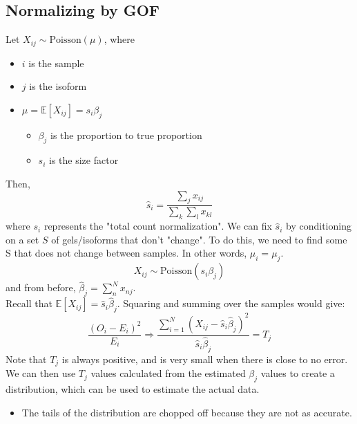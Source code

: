 \documentclass[10pt]{article}
\begin{document}
\subsection*{Normalizing by GOF}
Let $X_{ij} \sim \text{Poisson}(\mu)$, where
\begin{itemize}
    \item $i$ is the sample
    \item $j$ is the isoform
    \item $\mu = \mathbb{E}[X_{ij}] = s_i \beta_j$
    \begin{itemize}
        \item $\beta_j$ is the proportion to true proportion
        \item $s_i$ is the size factor
    \end{itemize}
\end{itemize}    
Then,
\[\hat s_i = \frac{\sum_j x_{ij}}{\sum_k \sum_l x_{kl}}\]
where $s_i$ represents the "total count normalization".  We can fix $\hat s_i$ by conditioning on a set $S$ of gels/isoforms that don't "change".  To do this, we need to find some S that does not change between samples.  In other words, $\mu_i = \mu_j$.
\[X_{ij} \sim \text{Poisson}(s_i \beta_j)\]
and from before, $\hat \beta_j = \sum_n^N x_{nj}$.\\
Recall that $\mathbb{E}[X_{ij}] = \hat s_i \hat \beta_j$.  Squaring and summing over the samples would give:
\[\frac{(O_i - E_i)^2}{E_i} \Rightarrow \frac{\sum_{i = 1}^N (X_{ij} - \hat s_i \hat \beta_j)^2}{\hat s_i \hat \beta_j} = T_j\]
Note that $T_j$ is always positive, and is very small when there is close to no error.
We can then use $T_j$ values calculated from the estimated $\beta_j$ values to create a distribution, which can be used to estimate the actual data.
\begin{itemize}
    \item The tails of the distribution are chopped off because they are not as accurate.
\end{itemize}
\end{document}
